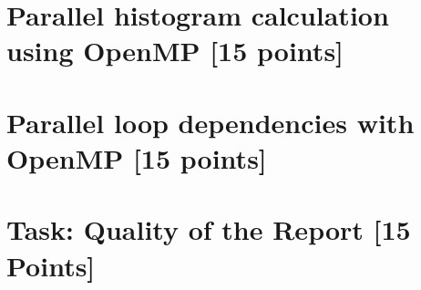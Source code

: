 \documentclass[unicode,11pt,a4paper,oneside,numbers=endperiod,openany]{scrartcl}
\begin{document}
\section{Parallel histogram calculation using OpenMP [15 points]}



\section{Parallel loop dependencies with OpenMP [15 points]}


\section{Task:  Quality of the Report   [15 Points]}
\end{document}
